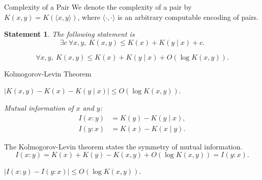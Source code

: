 \documentclass[
aspectratio=169]{beamer}
\newtheorem{statement}{Statement}
\begin{document}
\begin{frame}{Complexity of a Pair}
We denote the complexity of a pair by $K(x,y) = K(\langle x,y\rangle)$, where $\langle\cdot,\cdot\rangle$ is an arbitrary computable encoding of pairs.

\begin{statement}
    The following statement is 
    \[
    \exists c\ \forall x,y,\ K(x,y) \le K(x) + K(y \mid x) + c.
    \]
\end{statement}\vspace{-5mm}

\pause\pause

\begin{theorem}
    \[
    \forall x,y,\ K(x,y) \le K(x) + K(y \mid x) + O(\log K(x,y)).
    \]
\end{theorem}

\end{frame}


\begin{frame}{Kolmogorov-Levin Theorem}
\begin{theorem}\label{thm:kolmogorov-levin}
    $|K(x,y) - K(x) - K(y \mid x)| \le O(\log K(x,y))$.
\end{theorem}

\begin{definition}
    \emph{Mutual information of $x$ and $y$:}
    \[
    \begin{aligned}
        I(x:y) &= K(y) - K(y \mid x),\\
        I(y:x) &= K(x) - K(x \mid y).
    \end{aligned}
    \]
\end{definition}

The Kolmogorov-Levin theorem states the symmetry of mutual information.
\[
I(x:y) = K(x) + K(y) - K(x,y) + O(\log K(x,y)) = I(y:x).
\]
\vspace{-5mm}
\begin{corollary}
    $|I(x:y) - I(y:x)| \le O(\log K(x,y))$.
\end{corollary}
\end{frame}
\end{document}
